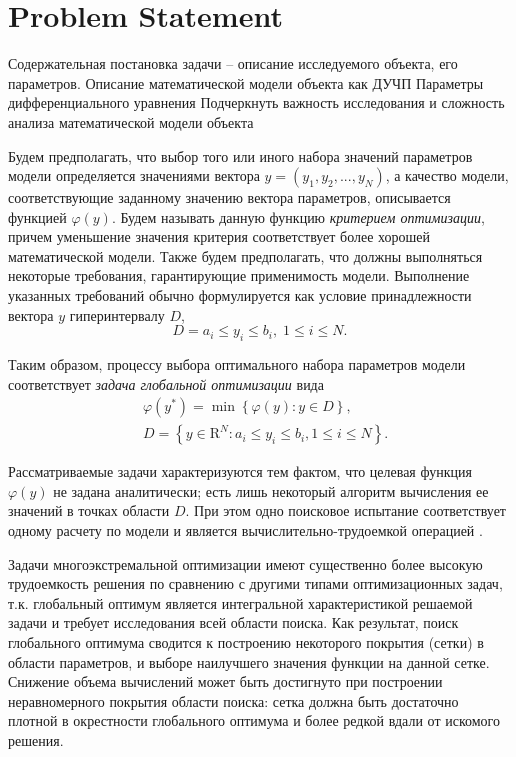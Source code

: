 \documentclass[sensors,article,submit,moreauthors,pdftex]{Definitions/mdpi}
\begin{document}
\section{Problem Statement}

Содержательная постановка задачи -- описание исследуемого объекта, его параметров. 
Описание математической модели объекта как ДУЧП
Параметры дифференциального уравнения
Подчеркнуть важность исследования и сложность анализа математической модели объекта


Будем предполагать, что выбор того или иного набора значений параметров модели определяется значениями вектора $y=(y_1,y_2,...,y_N)$, а качество модели, соответствующие заданному значению вектора параметров, описывается функцией $\varphi(y)$. Будем называть данную функцию \textit{критерием оптимизации}, причем уменьшение значения критерия соответствует более хорошей математической модели. Также будем предполагать, что должны выполняться некоторые требования, гарантирующие применимость модели. Выполнение указанных требований обычно формулируется как условие принадлежности вектора $y$ гиперинтервалу $D$,
\[
D={a_i \leq y_i \leq b_i, \; 1 \leq i \leq N}.
\]

Таким образом, процессу выбора оптимального набора параметров модели соответствует \textit{задача глобальной оптимизации} вида
\begin{eqnarray}\label{main_problem}
& \varphi(y^\ast)=\min{\left\{\varphi(y):y\in D\right\}},\\
& D=\left\{y\in \text{R}^N: a_i\leq y_i \leq b_i, 1\leq i \leq N\right\}. \nonumber
\end{eqnarray}

Рассматриваемые задачи характеризуются тем фактом, что целевая функция $\varphi(y)$ не задана аналитически; есть лишь некоторый алгоритм вычисления ее значений в точках области $D$. При этом одно поисковое испытание соответствует одному расчету по модели и является вычислительно-трудоемкой операцией \cite{Kalyulin2017,Sergeyev2018,Paulavicius2020}.

Задачи многоэкстремальной оптимизации имеют существенно более высокую трудоемкость решения по сравнению с другими типами оптимизационных задач, т.к. глобальный оптимум является интегральной характеристикой решаемой задачи и требует исследования всей области поиска. Как результат, поиск глобального оптимума сводится к построению некоторого покрытия (сетки) в области параметров, и выборе наилучшего значения функции на данной сетке. Снижение объема вычислений может быть достигнуто при построении неравномерного покрытия области поиска: сетка должна быть достаточно плотной в окрестности глобального оптимума и более редкой вдали от искомого решения.
\end{document}
